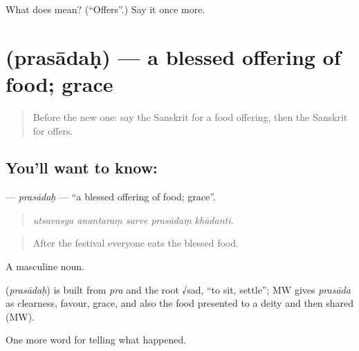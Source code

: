 \begin{tcolorbox}[breakable,colback=teal!4,colframe=teal!35!black,title={Before you move on}]
What does  mean? (\textquotedblleft{}Offers\textquotedblright{}.) Say it once more.
\end{tcolorbox}
\section[\texorpdfstring{\sk{प्रसादः} (prasādaḥ)}{प्रसादः (prasādaḥ)}]{ (prasādaḥ) — a blessed offering of food; grace}

\label{lesson:SA-C328-prasadah}



\begin{quote}
Before the new one: say the Sanskrit for a food offering, then the Sanskrit for offers.
\end{quote}

\subsection*{You'll want to know: }
\textbf{} — \emph{prasādaḥ} — \textquotedblleft{}a blessed offering of food; grace\textquotedblright{}.

\begin{quote}
    
\end{quote}

\begin{quote}
\emph{utsavasya anantaraṃ sarve prasādaṃ khādanti.}
\end{quote}

\begin{quote}
After the festival everyone eats the blessed food.
\end{quote}

A masculine noun.

\begin{cousinweb}
\textbf{} (\emph{prasādaḥ}) is built from \emph{pra} and the root √sad, \textquotedblleft{}to sit, settle\textquotedblright{}; MW gives \emph{prasāda} as clearness, favour, grace, and also the food presented to a deity and then shared (MW).
\end{cousinweb}

\begin{grammarlens}[title={What you've built}]
One more word for telling what happened.
\end{grammarlens}

